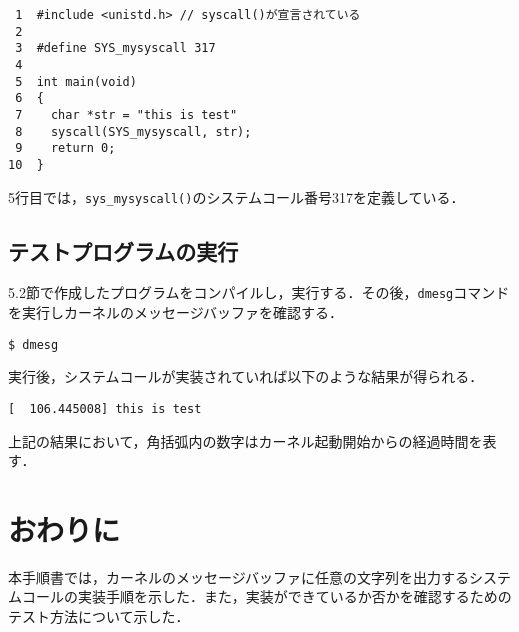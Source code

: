 \documentclass[12pt]{jsarticle}
\begin{document}
\begin{verbatim}
 1  #include <unistd.h> // syscall()が宣言されている
 2
 3  #define SYS_mysyscall 317
 4 
 5  int main(void)
 6  {
 7    char *str = "this is test"
 8    syscall(SYS_mysyscall, str);
 9    return 0;
10  } 
\end{verbatim}
5行目では，\verb|sys_mysyscall()|のシステムコール番号317を定義している．

\subsection{テストプログラムの実行}
5.2節で作成したプログラムをコンパイルし，実行する．その後，\verb|dmesg|コマンドを実行しカーネルのメッセージバッファを確認する．

\begin{verbatim}
$ dmesg
\end{verbatim}

実行後，システムコールが実装されていれば以下のような結果が得られる．
\begin{verbatim}
[  106.445008] this is test
\end{verbatim}
上記の結果において，角括弧内の数字はカーネル起動開始からの経過時間を表す．

\section{おわりに}
\label{sec:conclusion}
本手順書では，カーネルのメッセージバッファに任意の文字列を出力するシステムコールの実装手順を示した．また，実装ができているか否かを確認するためのテスト方法について示した．



\end{document}
